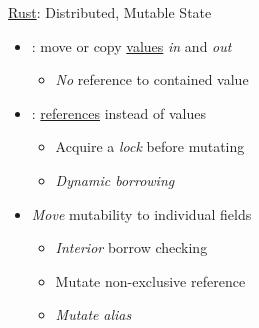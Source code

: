 \begin{frame}[fragile]{\underline{Rust}: Distributed, Mutable State \hfill {\footnotesize \currentname}}


    \begin{itemize}

    \item {}: move or copy \underline{values} \textit{in} and \textit{out}
        \begin{itemize}
            \item \textit{No} reference to contained value
        \end{itemize}

    \item {}: \underline{references} instead of values
        \begin{itemize}
            \item Acquire a \textit{lock} before mutating
            \item \textit{Dynamic borrowing}
        \end{itemize}

    \item \textit{Move} mutability to individual fields
        \begin{itemize}
            \item \textit{Interior} borrow checking
            \item Mutate non-exclusive reference
            \item \textit{Mutate}  \textit{alias}
        \end{itemize}

    \end{itemize}

    \vfill

\end{frame}

